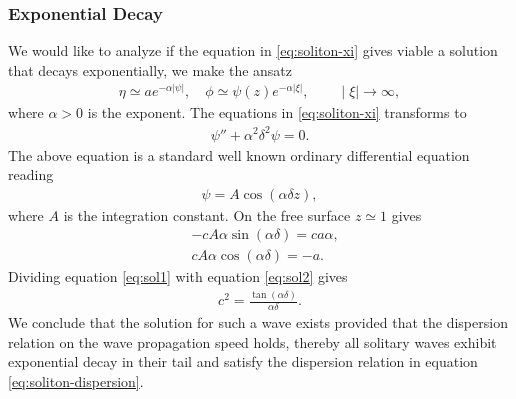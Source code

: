 \subsubsection{Exponential Decay}
We would like to analyze if the equation in \ref{eq:soliton-xi} gives viable a
solution that decays exponentially, we make the ansatz
\begin{align}
    \eta \simeq a e^{-\alpha |\psi|},\quad \phi \simeq \psi(z)e^{-\alpha
    |\xi|}, \qquad  \mid \xi \mid \rightarrow \infty,
\end{align}
where $\alpha>0$ is the exponent. The equations in \ref{eq:soliton-xi}
transforms to
\begin{align}
    \psi'' + \alpha^2 \delta^2\psi = 0.
\end{align}
The above equation is a standard well known ordinary differential equation
reading
\begin{align}
    \psi = A \cos(\alpha\delta z),
\end{align}
where $A$ is the integration constant. On the free surface $z\simeq 1$ gives
\begin{align}
    &-cA\alpha\sin(\alpha\delta) = ca\alpha,\label{eq:sol1}\\
    &cA\alpha \cos(\alpha\delta) = -a \label{eq:sol2}.
\end{align}
Dividing equation \ref{eq:sol1} with equation \ref{eq:sol2} gives
\begin{align} \label{eq:soliton-dispersion}
    c^2 = \frac{\tan\left(\alpha\delta  \right) }{\alpha\delta}.
\end{align}
We conclude that the solution for such a wave exists provided that the
dispersion relation on the wave propagation speed holds, thereby all solitary
waves exhibit exponential decay in their tail and satisfy the dispersion
relation in equation \ref{eq:soliton-dispersion}.
